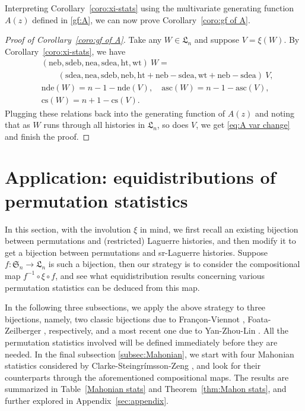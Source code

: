 \documentclass[12pt]{amsart}
\numberwithin{equation}{section}
\theoremstyle{plain}
\theoremstyle{definition}
\def\SS{\mathfrak{S}}
\def\LH{\mathfrak{L}}
\def\cs{\mathrm{cs}}
\def\neb{\mathrm{neb}}
\def\nea{\mathrm{nea}}
\def\sdeb{\mathrm{sdeb}}
\def\sdea{\mathrm{sdea}}
\def\nde{\mathrm{nde}}
\def\het{\mathrm{ht}}
\def\wt{\mathrm{wt}}
\def\asc{\mathrm{asc}}
\begin{document}
Interpreting Corollary~\ref{coro:xi-stats} using the multivariate generating function $A(z)$ defined in \eqref{gf:A}, we can now prove Corollary~\ref{coro:gf of A}.
\begin{proof}[Proof of Corollary~\ref{coro:gf of A}]
Take any $W\in\LH_n$ and suppose $V=\xi(W)$. By Corollary~\ref{coro:xi-stats}, we have
\begin{align*}
& (\neb,\sdeb,\nea,\sdea,\het,\wt)\:W =\\
& \qquad (\sdea,\nea,\sdeb,\neb,\het+\neb-\sdea,\wt+\neb-\sdea)\:V,\\
& \nde(W)=n-1-\nde(V),\quad \asc(W)=n-1-\asc(V),\\
& \cs(W)=n+1-\cs(V).
\end{align*}
Plugging these relations back into the generating function of $A(z)$ and noting that as $W$ runs through all histories in $\LH_n$, so does $V$, we get \eqref{eq:A var change} and finish the proof.
\end{proof}



\section{Application: equidistributions of permutation statistics}\label{sec:app}


In this section, with the involution $\xi$ in mind, we first recall an existing bijection between permutations and (restricted) Laguerre histories, and then modify it to get a bijection between permutations and sr-Laguerre histories. Suppose $f: \SS_n\rightarrow \LH_n$ is such a bijection, then our strategy is to consider the compositional map $f^{-1}\circ\xi\circ f$, and see what equidistribution results concerning various permutation statistics can be deduced from this map.

In the following three subsections, we apply the above strategy to three bijections, namely, two classic bijections due to Fran\c con-Viennot \cite{FV},  Foata-Zeilberger \cite{FZ90}, respectively, and a most recent one due to Yan-Zhou-Lin \cite{YZL}. All the permutation statistics involved will be defined immediately before they are needed. In the final subsection \ref{subsec:Mahonian}, we start with four Mahonian statistics considered by Clarke-Steingr\'{i}msson-Zeng \cite{CSZ}, and look for their counterparts through the aforementioned compositional maps. The results are summarized in Table~\ref{Mahonian stats} and Theorem~\ref{thm:Mahon stats}, and further explored in Appendix~\ref{sec:appendix}.
\end{document}
